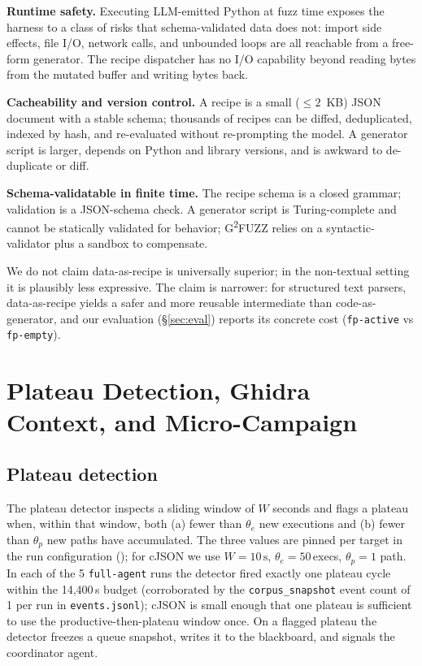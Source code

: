 \documentclass[11pt]{article}
\begin{document}
\textbf{Runtime safety.} Executing LLM-emitted Python at fuzz time
exposes the harness to a class of risks that schema-validated data
does not: import side effects, file I/O, network calls, and unbounded
loops are all reachable from a free-form generator. The recipe
dispatcher has no I/O capability beyond reading bytes from the
mutated buffer and writing bytes back.

\textbf{Cacheability and version control.} A recipe is a small
($\leq 2$~KB) JSON document with a stable schema; thousands of
recipes can be diffed, deduplicated, indexed by hash, and
re-evaluated without re-prompting the model. A generator script is
larger, depends on Python and library versions, and is awkward to
de-duplicate or diff.

\textbf{Schema-validatable in finite time.} The recipe schema is a
closed grammar; validation is a JSON-schema check. A generator
script is Turing-complete and cannot be statically validated for
behavior; G\textsuperscript{2}FUZZ relies on a syntactic-validator
plus a sandbox to compensate.

We do not claim data-as-recipe is universally superior; in the
non-textual setting it is plausibly less expressive. The claim is
narrower: for structured text parsers, data-as-recipe yields a safer
and more reusable intermediate than code-as-generator, and our
evaluation (\S\ref{sec:eval}) reports its concrete cost
(\texttt{fp-active} vs \texttt{fp-empty}).

\section{Plateau Detection, Ghidra Context, and Micro-Campaign}
\label{sec:plateau}

\subsection{Plateau detection}
\label{sec:plateau:detect}

The plateau detector inspects a sliding window of $W$ seconds and
flags a plateau when, within that window, both (a) fewer than
$\theta_e$ new executions and (b) fewer than $\theta_p$ new paths
have accumulated. The three values are pinned per target in the run
configuration (); for
cJSON we use $W=10\,\mathrm{s}$, $\theta_e=50$\,execs, $\theta_p=1$
path. In each of the 5 \texttt{full-agent} runs the detector fired
exactly one plateau cycle within the 14{,}400\,s budget (corroborated
by the \texttt{corpus\_snapshot} event count of 1 per run in
\texttt{events.jsonl}); cJSON is small enough that one plateau is
sufficient to use the productive-then-plateau window once. On a
flagged plateau the detector freezes a queue snapshot, writes it to
the blackboard, and signals the coordinator agent.
\end{document}
